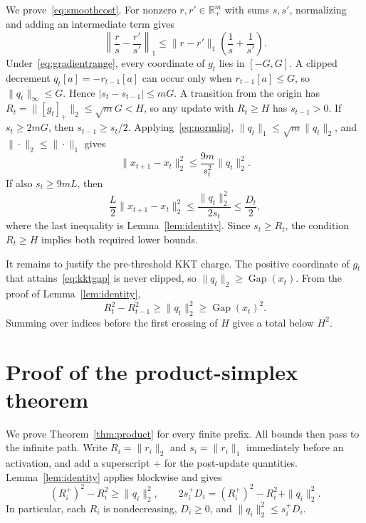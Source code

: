 \documentclass{article}
\newcommand{\Gap}{\operatorname{Gap}}
\newcommand{\pos}[1]{\left[#1\right]_+}
\begin{document}
We prove~\eqref{eq:smoothcost}. For nonzero $r,r'\in\mathbb R_+^m$ with sums $s,s'$, normalizing and adding an intermediate term gives
\begin{equation}
\left\|\frac r s-\frac{r'}{s'}\right\|_1
\le\|r-r'\|_1\left(\frac1s+\frac1{s'}\right).
\label{eq:normlip}
\end{equation}
Under~\eqref{eq:gradientrange}, every coordinate of $g_t$ lies in $[-G,G]$. A clipped decrement $q_t[a]=-r_{t-1}[a]$ can occur only when $r_{t-1}[a]\le G$, so $\|q_t\|_\infty\le G$. Hence $|s_t-s_{t-1}|\le mG$. A transition from the origin has $R_t=\|\pos{g_t}\|_2\le\sqrt mG<H$, so any update with $R_t\ge H$ has $s_{t-1}>0$. If $s_t\ge2mG$, then $s_{t-1}\ge s_t/2$. Applying~\eqref{eq:normlip}, $\|q_t\|_1\le\sqrt m\|q_t\|_2$, and $\|\cdot\|_2\le\|\cdot\|_1$ gives
\begin{equation}
\|x_{t+1}-x_t\|_2^2
\le\frac{9m}{s_t^2}\|q_t\|_2^2.
\end{equation}
If also $s_t\ge9mL$, then
\begin{equation}
\frac L2\|x_{t+1}-x_t\|_2^2
\le\frac{\|q_t\|_2^2}{2s_t}
\le\frac{D_t}{2},
\end{equation}
where the last inequality is Lemma~\ref{lem:identity}. Since $s_t\ge R_t$, the condition $R_t\ge H$ implies both required lower bounds.

It remains to justify the pre-threshold KKT charge. The positive coordinate of $g_t$ that attains~\eqref{eq:kktgap} is never clipped, so $\|q_t\|_2\ge\Gap(x_t)$. From the proof of Lemma~\ref{lem:identity},
\begin{equation}
R_t^2-R_{t-1}^2\ge\|q_t\|_2^2\ge\Gap(x_t)^2.
\end{equation}
Summing over indices before the first crossing of $H$ gives a total below $H^2$.

\section{Proof of the product-simplex theorem}
\label{app:product}

We prove Theorem~\ref{thm:product} for every finite prefix. All bounds then pass to the infinite path. Write $R_i=\|r_i\|_2$ and $s_i=\|r_i\|_1$ immediately before an activation, and add a superscript $+$ for the post-update quantities. Lemma~\ref{lem:identity} applies blockwise and gives
\begin{equation}
(R_i^+)^2-R_i^2\ge\|q_i\|_2^2,
\qquad
2s_i^+D_i=(R_i^+)^2-R_i^2+\|q_i\|_2^2.
\label{eq:productidentity}
\end{equation}
In particular, each $R_i$ is nondecreasing, $D_i\ge0$, and $\|q_i\|_2^2\le s_i^+D_i$.
\end{document}
